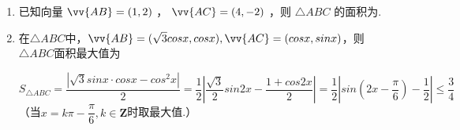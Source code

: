 \begin{enumerate}
\begin{enumerate}
\begin{jieda}
            故$sin^2\theta = 1 - cos^2\theta = \dfrac{(a^2+b^2)\cdot(c^2+d^2) - (ac+bd)^2}{(a^2+b^2)\cdot(c^2+d^2)} = \dfrac{(ad - bc)^2}{(a^2+b^2)\cdot(c^2+d^2)}$，\\
            即$sin\theta = \dfrac{|ad-bc|}{\sqrt{a^2+b^2} \cdot \sqrt{c^2+d^2}}$，故$S_{\triangle OAB} = \dfrac{|ad-bc|}{2}$
        \end{jieda}
        \item 已知向量 $\vv{AB} = \left( {1,2}\right)$ ， $\vv{AC} = \left( {4, - 2}\right)$ ，则 $\bigtriangleup  {ABC}$ 的面积为.
        \item 在$\triangle ABC$中，$\vv{AB} = (\sqrt{3}cosx, cosx), \vv{AC} = (cosx, sinx)$，则$\triangle ABC$面积最大值为
        \begin{jieda}
            \newline
            $S_{\triangle ABC} = \dfrac{|\sqrt{3}sinx \cdot cosx - cos^2x|}{2} = \dfrac{1}{2}\left| \dfrac{\sqrt{3}}{2}sin2x - \dfrac{1+cos2x}{2}\right| = \dfrac{1}{2} \left | sin(2x-\dfrac{\pi}{6}) - \dfrac{1}{2} \right| \leq \dfrac{3}{4}$\\
            （当$x = k\pi - \dfrac{\pi}{6}, k \in \mathbf{Z}$时取最大值.）
        \end{jieda}


\end{enumerate}
\end{enumerate}
